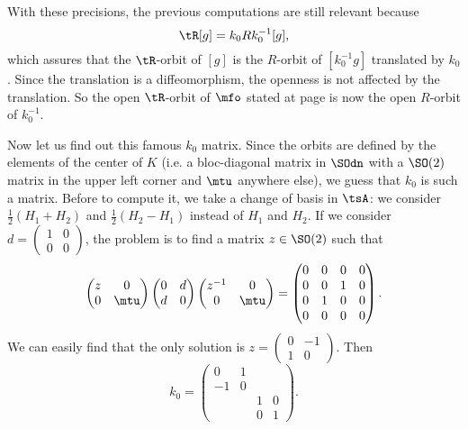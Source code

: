 With these precisions, the previous computations are still relevant because
\begin{equation}
	\tR[g]=k_0Rk_0^{-1}[g],
\end{equation}
which assures that the $\tR$-orbit of $[g]$ is the $R$-orbit of $[k_0^{-1} g]$ translated by
$k_0$. Since the translation is a diffeomorphism, the openness is not affected by the
translation. So the open $\tR$-orbit of $\mfo$ stated at page
\pageref{pg:mfo_ouvert} is now the open $R$-orbit of $k_0^{-1}$.

Now let us find out this famous $k_0$ matrix. Since the orbits are defined by the elements of the center of $K$ (i.e. a bloc-diagonal matrix in $\SOdn$ with a $\SO(2)$ matrix in the upper left corner and $\mtu$ anywhere else), we guess that $k_0$ is such a matrix. Before to compute it, we take a change of basis in $\tsA$: we consider $\frac{1}{2}(H_1+H_2)$ and $\frac{1}{2}(H_2-H_1)$ instead of $H_1$ and $H_2$. If we consider $d=\begin{pmatrix} 1&0\\0&0 \end{pmatrix}$, the problem is to find a matrix $z\in \SO(2)$ such that
\[
	\begin{pmatrix}
		z & 0    \\
		0 & \mtu
	\end{pmatrix}
	\begin{pmatrix}
		0 & d \\
		d & 0
	\end{pmatrix}
	\begin{pmatrix}
		z^{-1} & 0    \\
		0      & \mtu
	\end{pmatrix}
	=
	\begin{pmatrix}
		0 & 0 & 0 & 0 \\
		0 & 0 & 1 & 0 \\
		0 & 1 & 0 & 0 \\
		0 & 0 & 0 & 0
	\end{pmatrix}.
\]
We can easily find that the only solution is
$z=\begin{pmatrix}
		0 & -1 \\
		1 & 0
	\end{pmatrix}$.
Then
\begin{equation}
	k_0=
	\begin{pmatrix}
		0  & 1 &   &   \\
		-1 & 0 &   &   \\
		   &   & 1 & 0 \\
		   &   & 0 & 1
	\end{pmatrix}.
\end{equation}

